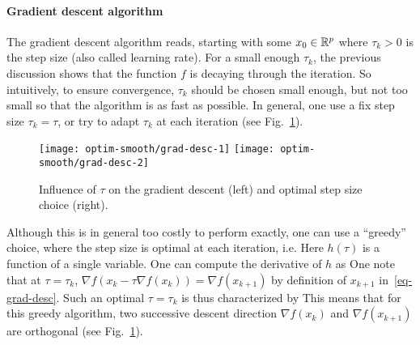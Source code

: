\paragraph{Gradient descent algorithm}

The gradient descent algorithm reads, starting with some $x_0 \in \mathbb{R}^p$
where $\tau_k>0$ is the step size (also called learning rate). For a small enough $\tau_k$, the previous discussion shows that the function $f$ is decaying through the iteration. So intuitively, to ensure convergence, $\tau_k$ should be chosen small enough, but not too small so that the algorithm is as fast as possible.
%
In general, one use a fix step size $\tau_k=\tau$, or try to adapt $\tau_k$ at each iteration (see Fig.~\ref{fig-gradesc}). 


\begin{figure}
\centering
\texttt{[image: optim-smooth/grad-desc-1]} \quad
\texttt{[image: optim-smooth/grad-desc-2]} 
\caption{\label{fig-gradesc}
Influence of $\tau$ on the gradient descent (left) and optimal step size choice (right).
}
\end{figure}


\begin{rem}
Although this is in general too costly to perform exactly, one can use a ``greedy'' choice, where the step size is optimal at each iteration, i.e. 
Here $h(\tau)$ is a function of a single variable. One can compute the derivative of $h$ as
One note that at $\tau=\tau_k$, $\nabla f(x_k-\tau \nabla f(x_k))=\nabla f(x_{k+1})$ by definition of $x_{k+1}$ in~\eqref{eq-grad-desc}. 
%
Such an optimal $\tau=\tau_k$ is thus characterized by
This means that for this greedy algorithm, two successive descent direction $\nabla f(x_k)$ and $\nabla f(x_{k+1})$ are orthogonal (see Fig.~\ref{fig-gradesc}).
\end{rem}




